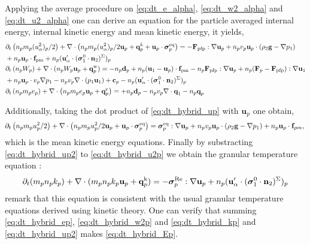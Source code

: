 Applying the average procedure on \ref{eq:dt_e_alpha}, \ref{eq:dt_w2_alpha} and \ref{eq:dt_u2_alpha} one can derive an equation for the particle averaged internal energy, internal kinetic energy and mean kinetic energy, it yields, 
\begin{align}
    \label{eq:dt_hybrid_u2p}
    &\partial_t \left(n_p m_p (u_\alpha^2)_p/ 2\right)
    + \mathbf{\nabla}\cdot \left(n_p
    m_p (u_\alpha^2)_p/ 2 \textbf{u}_p 
    + \textbf{q}^k_p
    + \textbf{u}_p \cdot \bm{\sigma}_p^\text{eq}
    \right)
    = 
    - \textbf{F}_\text{pfp} : \nabla \textbf{u}_p
    + n_p v_p \textbf{u}_p \cdot
    (\rho_2 \textbf{g} - \mathbf{\nabla} p_1)  \nonumber\\
    &+ n_p\textbf{u}_p \cdot \textbf{f}_\text{pm}
    +n_p(\textbf{u}_\alpha'\cdot(\bm{\sigma}_1^0 \cdot \textbf{n}_2)^\Sigma)_p
    \\
    \label{eq:dt_hybrid_w2p}
    &\partial_t \left(n_p W_p\right)
    + \mathbf{\nabla}\cdot 
    (n_p W_p
    \textbf{u}_p 
    +  \textbf{q}_p^\text{w}
    )
    = 
    - n_p \textbf{d}_p
    +n_p (\textbf{u}_1 - \textbf{u}_p)  \cdot \textbf{f}_\text{pm}
    - n_p \textbf{F}_\text{pfp} : \mathbf{\nabla} \textbf{u}_p\nonumber
    + n_p (\textbf{F}_p-\textbf{F}_\text{pfp}) : \mathbf{\nabla} \textbf{u}_1\\
    &+ n_p \textbf{u}_p \cdot  v_p\mathbf{\nabla} p_1
    - n_pv_p \mathbf{\nabla}\cdot (p_1 \textbf{u}_1)
    + \textbf{c}_p
    - n_p(\textbf{u}_\alpha'\cdot(\bm{\sigma}_1^0 \cdot \textbf{n}_2)^\Sigma)_p\\
    \label{eq:dt_hybrid_ep}
    &\partial_t \left(n_p m_p e_p\right)
    + \mathbf{\nabla}\cdot \left(n_p
    m_p e_p \textbf{u}_p 
    +  \textbf{q}_p^\text{e}
    \right)
    = 
    + n_p \textbf{d}_p
    - n_p v_p \mathbf{\nabla}\cdot \textbf{q}_1
    - n_p \textbf{q}_p
\end{align}


Additionally, taking the dot product of \ref{eq:dt_hybrid_up} with $\textbf{u}_p$ one obtain, 
\begin{equation}
    \label{eq:dt_hybrid_up2}
    \partial_t \left(n_p m_p u_p^2/ 2\right)
    + \mathbf{\nabla}\cdot \left(n_p
    m_p u_p^2/ 2 \textbf{u}_p 
    + \textbf{u}_p \cdot \bm{\sigma}_p^\text{eq}
    \right)
    = 
     \bm{\sigma}_p^\text{eq}  :\mathbf{\nabla} \textbf{u}_p
    +  n_p v_p \textbf{u}_p \cdot 
    (\rho_2 \textbf{g} - \mathbf{\nabla} p_1)
    + n_p \textbf{u}_p \cdot \textbf{f}_{pm},\\
\end{equation}
which is the mean kinetic energy equations. 
Finally by substracting \ref{eq:dt_hybrid_up2} to \ref{eq:dt_hybrid_u2p} we obtain the granular temperature equation :
\begin{multline}
    \label{eq:dt_hybrid_kp}
    \partial_t(m_p n_pk_p)
    + \mathbf{\nabla}\cdot(m_pn_p k_p \textbf{u}_p 
    + \textbf{q}_p^\text{k})
    = 
     - \bm{\sigma}_p^\text{Re} :\mathbf{\nabla} \textbf{u}_p
     + n_p (\textbf{u}_\alpha' \cdot (\bm{\sigma}_1^0 \cdot  \textbf{n}_2)^\Sigma)_p
    \\
\end{multline}
remark that this equation is consistent with the usual granular temperature equations derived using kinetic theory. 
One can verify that summing \ref{eq:dt_hybrid_ep}, \ref{eq:dt_hybrid_w2p} and \ref{eq:dt_hybrid_kp} and \ref{eq:dt_hybrid_up2} makes \ref{eq:dt_hybrid_Ep}.  

